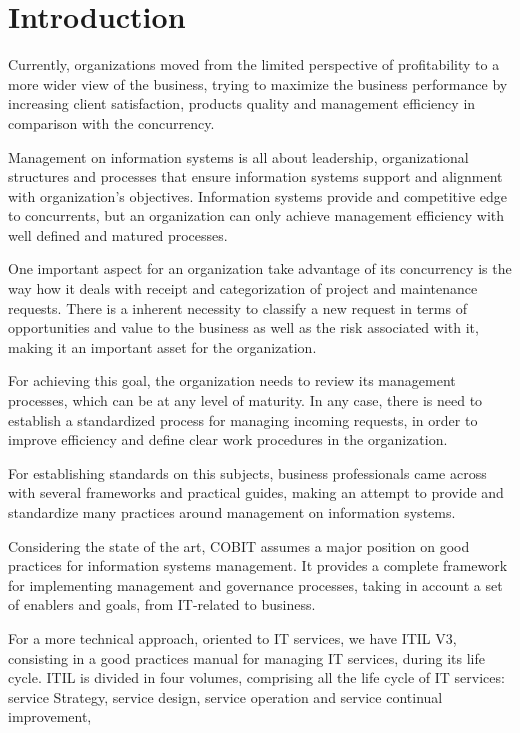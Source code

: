 
% 
% 

\section{Introduction}

Currently, organizations moved from the limited perspective of profitability to a more wider view of the business, trying to maximize the business performance by increasing client satisfaction, products quality and management efficiency in comparison with the concurrency.\par
Management on information systems is all about leadership, organizational structures and processes that ensure information systems support and alignment with organization's objectives. Information systems provide and competitive edge to concurrents, but an organization can only achieve management efficiency with well defined and matured processes. \par
One important aspect for an organization take advantage of its concurrency is the way how it deals with receipt and categorization of project and maintenance requests. There is a inherent necessity to classify a new request in terms of opportunities  and value to the business as well as the risk associated with it, making it an important asset for the organization.\par
For achieving this goal, the organization needs to review its management processes, which can be at any level of maturity. In any case, there is need to establish a standardized process for managing incoming requests, in order to improve efficiency and define clear work procedures in the organization.\par
For establishing standards on this subjects, business professionals came across with several frameworks and practical guides, making an attempt to provide and standardize many practices around management on information systems.\par
Considering the state of the art, COBIT assumes a major position on good practices for information systems management. It provides a complete framework for implementing management and governance processes, taking in account a set of enablers and goals, from IT-related to business.\par
For a more technical approach, oriented to IT services, we have ITIL V3, consisting in a good practices manual for managing IT services, during its life cycle. ITIL is divided in four volumes, comprising all the life cycle of IT services: service Strategy, service design, service operation and service continual improvement,\par
